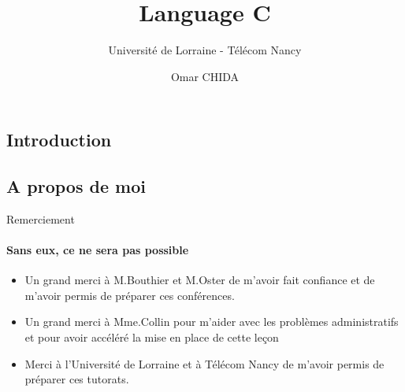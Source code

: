 \documentclass{beamer}
\title{Language C}
\subtitle{Université de Lorraine - Télécom Nancy}
\author{Omar CHIDA}
\begin{document}
  \frame[c]{\maketitle}


  \begin{darkframes}
  	\section{Introduction}
  	
  	\subsection{A propos de moi}
  	\begin{frame}{Remerciement}
  		\framesubtitle{Sans eux, ce ne sera pas possible}
  		\begin{itemize}
  			\item Un grand merci à M.Bouthier et M.Oster de m'avoir fait confiance et de m'avoir permis de préparer ces conférences.
  			\item Un grand merci à Mme.Collin pour m'aider avec les problèmes administratifs et pour avoir accéléré la mise en place de cette leçon
  			\item Merci à l'Université de Lorraine et à Télécom Nancy de m'avoir permis de préparer ces tutorats.
  		\end{itemize}
  	\end{frame}
  	

\end{darkframes}
\end{document}

